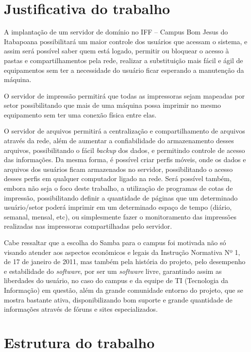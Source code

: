 \section{Justificativa do trabalho}

A implantação de um servidor de domínio no IFF – Campus Bom Jesus do Itabapoana possibilitará um maior controle dos usuários que acessam o sistema, e assim será possível saber quem está logado, permitir ou bloquear o acesso à pastas e compartilhamentos pela rede, realizar a substituição mais fácil e ágil de equipamentos sem ter a necessidade do usuário ficar esperando a manutenção da máquina.

O servidor de impressão permitirá que todas as impressoras sejam mapeadas por setor possibilitando que mais de uma máquina possa imprimir no mesmo equipamento sem ter uma conexão física entre elas.

O servidor de arquivos permitirá a centralização e compartilhamento de arquivos através da rede, além de aumentar a confiabilidade do armazenamento desses arquivos, possibilitando o fácil \textit{backup} dos dados, e permitindo controle de acesso das informações. Da mesma forma, é possível criar perfis móveis, onde os dados e arquivos dos usuários ficam armazenados no servidor, possibilitando o acesso desses perfis em qualquer computador ligado na rede. Será possível também, embora não seja o foco deste trabalho, a utilização de programas de cotas de impressão, possibilitando definir a quantidade de páginas que um determinado usuário/setor poderá imprimir em um determinado espaço de tempo (diário, semanal, mensal, etc), ou simplesmente fazer o monitoramento das impressões realizadas nas impressoras compartilhadas pelo servidor.

Cabe ressaltar que a escolha do Samba para o campus foi motivada não só visando atender aos aspectos econômicos e legais da Instrução Normativa Nº 1, de 17 de janeiro de 2011, mas também pela história do projeto, pelo desempenho e estabilidade do \textit{software}, por ser um \textit{software} livre, garantindo assim as liberdades do usuário, no caso do campus e da equipe de TI (Tecnologia da Informação) em questão, além da grande comunidade entorno do projeto, que se mostra bastante ativa, disponibilizando bom suporte e grande quantidade de informações através de fóruns e sites especializados.

\section{Estrutura do trabalho}

